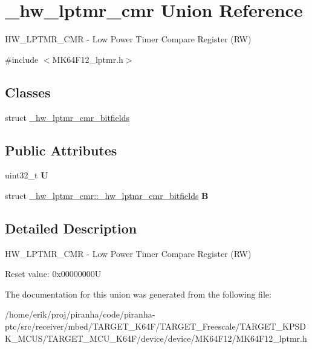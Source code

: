 \hypertarget{union__hw__lptmr__cmr}{}\section{\+\_\+hw\+\_\+lptmr\+\_\+cmr Union Reference}
\label{union__hw__lptmr__cmr}


H\+W\+\_\+\+L\+P\+T\+M\+R\+\_\+\+C\+MR -\/ Low Power Timer Compare Register (RW)  




{\ttfamily \#include $<$M\+K64\+F12\+\_\+lptmr.\+h$>$}

\subsection*{Classes}
\begin{DoxyCompactItemize}
\item 
struct \hyperlink{struct__hw__lptmr__cmr_1_1__hw__lptmr__cmr__bitfields}{\+\_\+hw\+\_\+lptmr\+\_\+cmr\+\_\+bitfields}
\end{DoxyCompactItemize}
\subsection*{Public Attributes}
\begin{DoxyCompactItemize}
\item 
uint32\+\_\+t {\bfseries U}\hypertarget{union__hw__lptmr__cmr_addbf6e507ef3f348d514e55b5764061c}{}\label{union__hw__lptmr__cmr_addbf6e507ef3f348d514e55b5764061c}

\item 
struct \hyperlink{struct__hw__lptmr__cmr_1_1__hw__lptmr__cmr__bitfields}{\+\_\+hw\+\_\+lptmr\+\_\+cmr\+::\+\_\+hw\+\_\+lptmr\+\_\+cmr\+\_\+bitfields} {\bfseries B}\hypertarget{union__hw__lptmr__cmr_ae53ccdb7dbc75081b85c1b708d40ed85}{}\label{union__hw__lptmr__cmr_ae53ccdb7dbc75081b85c1b708d40ed85}

\end{DoxyCompactItemize}


\subsection{Detailed Description}
H\+W\+\_\+\+L\+P\+T\+M\+R\+\_\+\+C\+MR -\/ Low Power Timer Compare Register (RW) 

Reset value\+: 0x00000000U 

The documentation for this union was generated from the following file\+:\begin{DoxyCompactItemize}
\item 
/home/erik/proj/piranha/code/piranha-\/ptc/src/receiver/mbed/\+T\+A\+R\+G\+E\+T\+\_\+\+K64\+F/\+T\+A\+R\+G\+E\+T\+\_\+\+Freescale/\+T\+A\+R\+G\+E\+T\+\_\+\+K\+P\+S\+D\+K\+\_\+\+M\+C\+U\+S/\+T\+A\+R\+G\+E\+T\+\_\+\+M\+C\+U\+\_\+\+K64\+F/device/device/\+M\+K64\+F12/M\+K64\+F12\+\_\+lptmr.\+h\end{DoxyCompactItemize}
